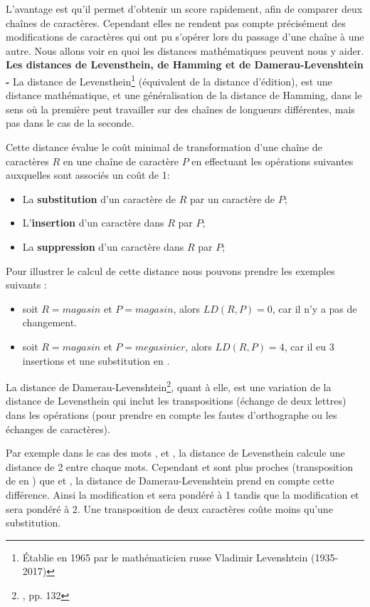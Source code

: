 L'avantage est qu'il permet d'obtenir un score rapidement, afin de comparer deux chaînes de caractères. Cependant elles ne rendent pas compte précisément des modifications de caractères qui ont pu s'opérer lors du passage d'une chaîne à une autre. Nous allons voir en quoi les distances mathématiques peuvent nous y aider.\\
\newpage
\textbf{Les distances de Levensthein, de Hamming et de Damerau-Levenshtein -} La distance de Levensthein\footnote{Établie en 1965 par le mathématicien russe Vladimir Levenshtein (1935-2017)} (équivalent de la distance d'édition), est une distance mathématique, et une généralisation de la distance de Hamming, dans le sens où la première peut travailler sur des chaînes de longueurs différentes, mais pas dans le cas de la seconde.

Cette distance évalue le coût minimal de transformation d'une chaîne de caractères $R$ en une chaîne de caractère $P$ en effectuant les opérations suivantes auxquelles sont associés un coût de 1:

\begin{itemize}
    \item La \textbf{substitution} d'un caractère de $R$ par un caractère de $P$;
    \item L'\textbf{insertion} d'un caractère dans $R$ par $P$;
    \item La \textbf{suppression} d'un caractère dans $R$ par $P$;
\end{itemize}

Pour illustrer le calcul de cette distance nous pouvons prendre les exemples suivants :

\begin{itemize}
    \item soit $R = magasin$ et $P= magasin$, alors $LD(R, P) = 0$, car il n'y a pas de changement.
    \item soit $R = magasin$ et $P= megasinier $, alors $LD(R, P) = 4$, car il eu 3 insertions  et une substitution  en . 
\end{itemize} 
\bigskip

La distance de Damerau-Levenshtein\footnote{\cite{chaumartin_traitement_2020}, pp. 132}, quant à elle, est une variation de la distance de Levensthein qui inclut les transpositions (échange de deux lettres) dans les opérations (pour prendre en compte les fautes d'orthographe ou les échanges de caractères).

Par exemple dans le cas des mots ,  et , la distance de Levensthein calcule une distance de 2 entre chaque mots. Cependant  et  sont plus proches (transposition de  en ) que  et , la distance de Damerau-Levenshtein prend en compte cette différence. Ainsi la modification  et  sera pondéré à 1 tandis que la modification  et  sera pondéré à 2. Une transposition de deux caractères coûte moins qu'une substitution. 

